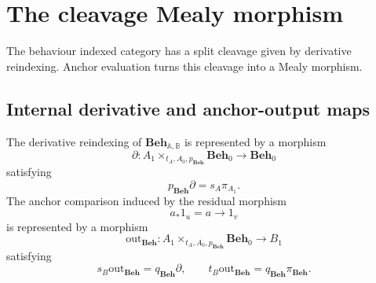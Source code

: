 \section{The cleavage Mealy morphism}
\label{sec:cleavage-mealy-morphism}

The behaviour indexed category has a split cleavage given by derivative reindexing. Anchor evaluation turns this cleavage into a Mealy morphism.

\subsection{Internal derivative and anchor-output maps}
\label{subsec:internal-derivative-anchor-output}

\begin{lemma}
\label{lem:internal-derivative-output-maps}
    The derivative reindexing of \(\mathbf{Beh}_{\mathbb A,\mathbb B}\) is represented by a morphism
    \[
        \partial:
        A_1\times_{t_A,A_0,p_{\mathbf{Beh}}}\mathbf{Beh}_0
        \longrightarrow
        \mathbf{Beh}_0
    \]
    satisfying
    \[
        p_{\mathbf{Beh}}\partial=s_A\pi_{A_1}.
    \]
    The anchor comparison induced by the residual morphism
    \[
        a_*1_u=a\longrightarrow 1_v
    \]
    is represented by a morphism
    \[
        \mathrm{out}_{\mathbf{Beh}}:
        A_1\times_{t_A,A_0,p_{\mathbf{Beh}}}\mathbf{Beh}_0
        \longrightarrow
        B_1
    \]
    satisfying
    \[
        s_B\mathrm{out}_{\mathbf{Beh}}
        =
        q_{\mathbf{Beh}}\partial,
        \qquad
        t_B\mathrm{out}_{\mathbf{Beh}}
        =
        q_{\mathbf{Beh}}\pi_{\mathbf{Beh}}.
    \]
\end{lemma}
